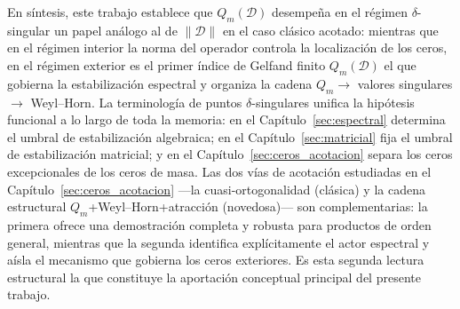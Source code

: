 \documentclass[12pt,a4paper]{article}
\theoremstyle{definition}
\theoremstyle{remark}
\newcommand{\D}{\mathcal{D}}
\begin{document}
En síntesis, este trabajo establece que $Q_m(\D)$ desempeña en el régimen $\delta$-singular un papel análogo al de $\|\D\|$ en el caso clásico acotado: mientras que en el régimen interior la norma del operador controla la localización de los ceros, en el régimen exterior es el primer índice de Gelfand finito $Q_m(\D)$ el que gobierna la estabilización espectral y organiza la cadena $Q_m \to$ valores singulares $\to$ Weyl--Horn. La terminología de puntos $\delta$-singulares unifica la hipótesis funcional a lo largo de toda la memoria: en el Capítulo~\ref{sec:espectral} determina el umbral de estabilización algebraica; en el Capítulo~\ref{sec:matricial} fija el umbral de estabilización matricial; y en el Capítulo~\ref{sec:ceros_acotacion} separa los ceros excepcionales de los ceros de masa. Las dos vías de acotación estudiadas en el Capítulo~\ref{sec:ceros_acotacion} ---la cuasi-ortogonalidad (clásica) y la cadena estructural $Q_m$+Weyl--Horn+atracción (novedosa)--- son complementarias: la primera ofrece una demostración completa y robusta para productos de orden general, mientras que la segunda identifica explícitamente el actor espectral y aísla el mecanismo que gobierna los ceros exteriores. Es esta segunda lectura estructural la que constituye la aportación conceptual principal del presente trabajo.

\nocite{*}


\end{document}
